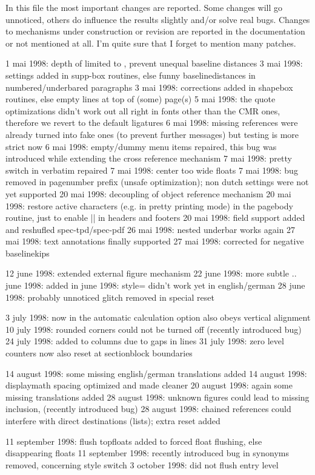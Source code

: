 In this file the most important changes are reported. Some changes will 
go unnoticed, others do influence the results slightly and/or solve real
bugs. Changes to mechanisms under construction or revision are reported
in the documentation or not mentioned at all. I'm quite sure that I 
forget to mention many patches.

 1 mai 1998: depth of \underbar limited to \dp\strutbox, prevent unequal 
             baseline distances 
 3 mai 1998: \splittopskip settings added in supp-box routines, else 
             funny baselinedistances in numbered/underbared paragraphs  
 3 mai 1998: \parskip corrections added in shapebox routines, else empty
             lines at top of (some) page(s)
 5 mai 1998: the quote optimizations didn't work out all right in fonts 
             other than the CMR ones, therefore we revert to the default
             ligatures  
 6 mai 1998: missing references were already turned into fake ones (to 
             prevent further messages) but testing is more strict now 
 6 mai 1998: empty/dummy menu items repaired, this bug was introduced while   
             extending the cross reference mechanism
 7 mai 1998: pretty switch in verbatim repaired
 7 mai 1998: center too wide floats
 7 mai 1998: bug removed in pagenumber prefix (unsafe optimization); non
             dutch settings were not yet supported 
20 mai 1998: decoupling of object reference mechanism
20 mai 1998: restore active characters (e.g. in pretty 
              printing mode) in the pagebody routine, just to 
              enable || in headers and footers 
20 mai 1998: field support added and reshufled spec-tpd/spec-pdf
26 mai 1998: nested underbar works again
27 mai 1998: text annotations finally supported
27 mai 1998: \oninterlineskip corrected for negative baselinekips 

12 june 1998: extended external figure mechanism 
22 june 1998: more subtle \startoverlay.. june 1998: \allowbreak added in  june 1998: style= didn't work yet in english/german 
28 june 1998: probably unnoticed glitch removed in special reset

 3 july 1998: now in \framed[width=fit,height=<dimen>,align=middle] 
              the automatic calculation option also obeys vertical 
              alignment
10 july 1998: rounded corners could not be turned off (recently 
              introduced bug)
24 july 1998: \DV added to columns due to gaps in lines 
31 july 1998: zero level counters now also reset at sectionblock
              boundaries

14 august 1998: some missing english/german translations added
14 august 1998: displaymath spacing optimized and made cleaner 
20 august 1998: again some missing translations added
28 august 1998: unknown figures could lead to missing 
                inclusion, (recently introduced bug) 
28 august 1998: chained references could interfere with direct 
                destinations (lists); extra reset added

11 september 1998: flush topfloats added to forced float flushing,      
                   else disappearing floats 
11 september 1998: recently introduced bug in synonyms 
                   removed, concerning style switch 
3 october 1998: \seeindex did not flush entry level 
